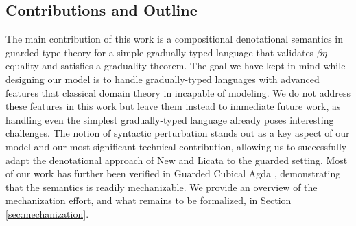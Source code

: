 


\subsection{Contributions and Outline}

The main contribution of this work is a compositional denotational semantics in
guarded type theory for a simple gradually typed language that validates
$\beta\eta$ equality and satisfies a graduality theorem.
%
The goal we have kept in mind while designing our model is to handle
gradually-typed languages with advanced features that classical domain theory in
incapable of modeling. We do not address these features in this work but leave
them instead to immediate future work, as handling even the simplest
gradually-typed language already poses interesting challenges.
%
The notion of syntactic perturbation stands out as a key aspect of our model
and our most significant technical contribution, allowing us to successfully
adapt the denotational approach of New and Licata to the guarded setting.
%
Most of our work has further been verified in Guarded Cubical Agda
\cite{veltri-vezzosi2020}, demonstrating that the semantics is readily
mechanizable. We provide an overview of the mechanization effort, and what
remains to be formalized, in Section \ref{sec:mechanization}.
%


%

